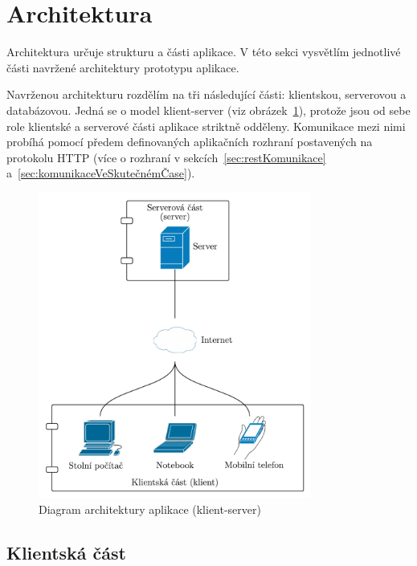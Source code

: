 
\section{Architektura}\label{sec:architektura}

Architektura určuje strukturu a části aplikace.
V této sekci vysvětlím jednotlivé části navržené architektury prototypu aplikace.

Navrženou architekturu rozdělím na tři následující části: klientskou, serverovou a databázovou.
Jedná se o model klient-server (viz obrázek~\ref{fig:client_server}), protože jsou od sebe role klientské a serverové části aplikace striktně odděleny.
Komunikace mezi nimi probíhá pomocí předem definovaných aplikačních rozhraní postavených na protokolu \gls{HTTP} (více o rozhraní v sekcích~\ref{sec:restKomunikace} a~\ref{sec:komunikaceVeSkutečnémČase}).

\begin{figure}[ht!]
    \centering
    \includegraphics[width=0.8\textwidth]{partials/navrh/clientServer2.pdf}
    \caption{Diagram architektury aplikace (klient-server)}\label{fig:client_server}
\end{figure}

\subsection{Klientská část}\label{subsec:klientskáČást}

